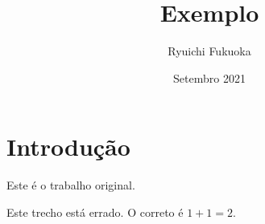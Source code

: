 \documentclass{article}
\title{Exemplo}
\author{Ryuichi Fukuoka}
\date{Setembro 2021}
\begin{document}
\maketitle

\section{Introdução}

\indent

Este é o trabalho original.

Este trecho está errado. O correto é $1+1=2$.
\end{document}
